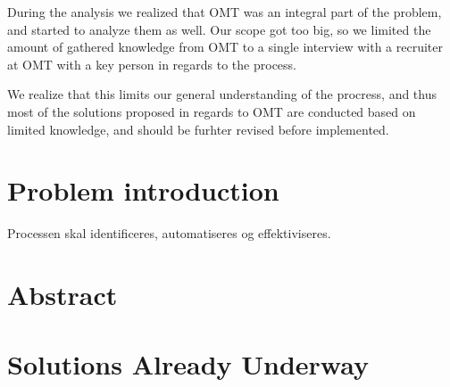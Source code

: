 During the analysis we realized that OMT was an integral part of the problem, and started to analyze them as well. Our scope got too big, so we limited the amount of gathered knowledge from OMT to a single interview with a recruiter at OMT with a key person in regards to the process. 

We realize that this limits our general understanding of the procress, and thus most of the solutions proposed in regards to OMT are conducted based on limited knowledge, and should be furhter revised before implemented. 

\section{Problem introduction}

Processen skal identificeres, automatiseres og effektiviseres.
\section{Abstract}


\section{Solutions Already Underway}
